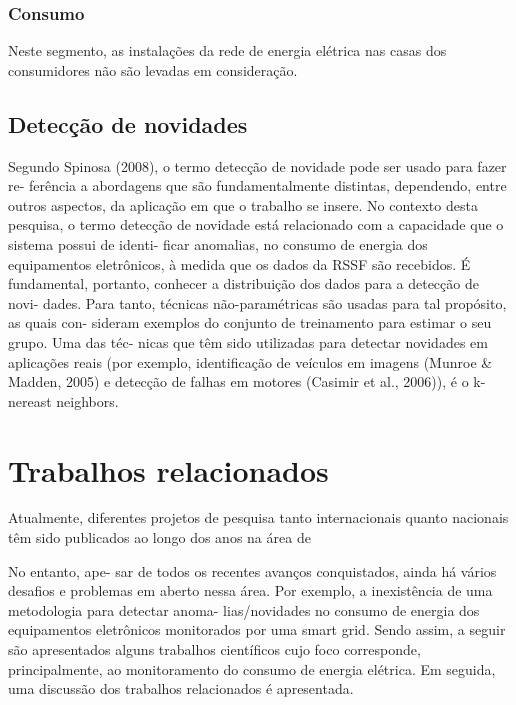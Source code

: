 \subsection{Consumo}
Neste segmento, as instalações da rede de energia elétrica nas casas dos consumidores não são levadas em consideração. 




\section{Detecção de novidades}

Segundo Spinosa (2008), o termo detecção de novidade pode ser usado para fazer re- ferência a abordagens que são fundamentalmente distintas, dependendo, entre outros aspectos, da aplicação em que o trabalho se insere. No contexto desta pesquisa, o termo detecção de novidade está relacionado com a capacidade que o sistema possui de identi- ficar anomalias, no consumo de energia dos equipamentos eletrônicos, à medida que os dados da RSSF são recebidos.
É fundamental, portanto, conhecer a distribuição dos dados para a detecção de novi- dades. Para tanto, técnicas não-paramétricas são usadas para tal propósito, as quais con- sideram exemplos do conjunto de treinamento para estimar o seu grupo. Uma das téc- nicas que têm sido utilizadas para detectar novidades em aplicações reais (por exemplo, identificação de veículos em imagens (Munroe & Madden, 2005) e detecção de falhas em motores (Casimir et al., 2006)), é o k-nereast neighbors.


\chapter{Trabalhos relacionados}

Atualmente, diferentes projetos de pesquisa tanto internacionais quanto nacionais têm sido publicados ao longo dos anos na área de

No entanto, ape- sar de todos os recentes avanços conquistados, ainda há vários desafios e problemas em aberto nessa área. Por exemplo, a inexistência de uma metodologia para detectar anoma- lias/novidades no consumo de energia dos equipamentos eletrônicos monitorados por uma smart grid. Sendo assim, a seguir são apresentados alguns trabalhos científicos cujo foco corresponde, principalmente, ao monitoramento do consumo de energia elétrica. Em seguida, uma discussão dos trabalhos relacionados é apresentada.

